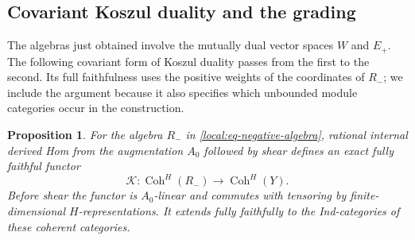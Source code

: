 \documentclass[11pt]{article}
\numberwithin{equation}{section}
\newtheorem{proposition}[theorem]{Proposition}
\theoremstyle{definition}
\theoremstyle{remark}
\newcommand{\Coh}{\operatorname{Coh}}
\begin{document}
\subsection{Covariant Koszul duality and the grading}
\label{local:subsec-koszul}

The algebras just obtained involve the mutually dual vector spaces
$W$ and $E_+$.  The following covariant form of Koszul duality passes
from the first to the second.  Its full faithfulness uses the positive
weights of the coordinates of $R_-$; we include the argument because
it also specifies which unbounded module categories occur in the
construction.

\begin{proposition}\label{local:graded-koszul}
For the algebra $R_-$ in \eqref{local:eq-negative-algebra}, rational
internal derived Hom from the augmentation $A_0$ followed by shear
defines an exact fully faithful functor
\begin{equation}\label{local:eq-koszul-functor}
 \mathcal K:\Coh^H(R_-)\longrightarrow\Coh^H(Y).
\end{equation}
Before shear the functor is $A_0$-linear and commutes with tensoring
by finite-dimensional $H$-representations.  It extends fully faithfully
to the Ind-categories of these coherent categories.
\end{proposition}
\end{document}

